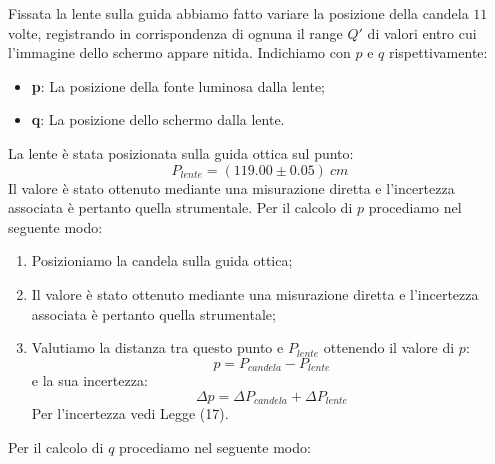Fissata la lente sulla guida abbiamo fatto variare la posizione della candela $11$ volte, registrando in corrispondenza di ognuna il range $Q'$ di valori entro cui l'immagine dello schermo appare nitida. Indichiamo con $p$ e $q$ rispettivamente:

\begin{itemize}
	\item \textbf{p}: La posizione della fonte luminosa dalla lente;
	\item \textbf{q}: La posizione dello schermo dalla lente.
\end{itemize}

La lente è stata posizionata sulla guida ottica sul punto:
\begin{equation}
	P_{lente} = (119.00\pm 0.05)\ cm
\end{equation}
Il valore è stato ottenuto mediante una misurazione diretta e l'incertezza associata è pertanto quella strumentale. Per il calcolo di $p$ procediamo nel seguente modo:

\begin{enumerate}
	\item Posizioniamo la candela sulla guida ottica;
	\item Il valore è stato ottenuto mediante una misurazione diretta e l'incertezza associata è pertanto 	quella strumentale;
	\item Valutiamo la distanza tra questo punto e $P_{lente}$ ottenendo il valore di $p$:
	\begin{equation}
		p=P_{candela} - P_{lente}
	\end{equation}
	e la sua incertezza:
	\begin{equation}
		\Delta p = \Delta P_{candela} + \Delta P_{lente}
	\end{equation}
	Per l'incertezza vedi Legge (17).
\end{enumerate}

Per il calcolo di $q$ procediamo nel seguente modo:

